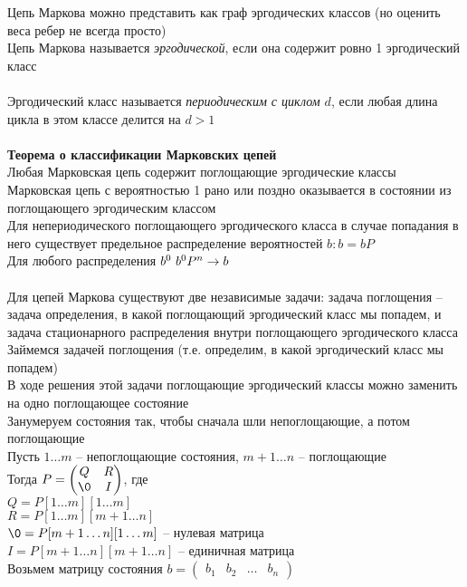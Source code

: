 \documentclass[12pt]{article}
\begin{document}
Цепь Маркова можно представить как граф эргодических классов (но оценить веса ребер не всегда просто)\\
Цепь Маркова называется \textit{эргодической}, если она содержит ровно 1 эргодический класс\\\\
Эргодический класс называется \textit{периодическим с циклом $d$}, если любая длина цикла в этом классе делится на $d > 1$\\\\
\textbf{Теорема о классификации Марковских цепей}\\
Любая Марковская цепь содержит поглощающие эргодические классы\\
Марковская цепь с вероятностью 1 рано или поздно оказывается в состоянии из поглощающего эргодическим классом\\
Для непериодического поглощающего эргодического класса в случае попадания в него существует предельное распределение вероятностей $b: b = bP$\\
Для любого распределения $b^0\ b^0P^n \rightarrow b$\\\\
Для цепей Маркова существуют две независимые задачи: задача поглощения -- задача определения, в какой поглощающий эргодический класс мы попадем, и задача стационарного распределения внутри поглощающего эргодического класса\\
Займемся задачей поглощения (т.е. определим, в какой эргодический класс мы попадем)\\
В ходе решения этой задачи поглощающие эргодический классы можно заменить на одно поглощающее состояние\\
Занумеруем состояния так, чтобы сначала шли непоглощающие, а потом поглощающие\\
Пусть $1\ldots m$ -- непоглощающие состояния, $m + 1\ldots n$ -- поглощающие\\
Тогда $P = \begin{pmatrix}
    Q & R\\
    \0 & I
\end{pmatrix}$, где \\
$Q = P[1\ldots m][1\ldots m]$\\
$R = P[1\ldots m][m+1\ldots n]$\\
$\0 = P[m+1\ldots n][1\ldots m]$ -- нулевая матрица \\
$I = P[m+1\ldots n][m+1\ldots n]$ -- единичная матрица\\
Возьмем матрицу состояния $b = \begin{pmatrix} b_1 & b_2 & \ldots & b_n \end{pmatrix}$\\
\end{document}
